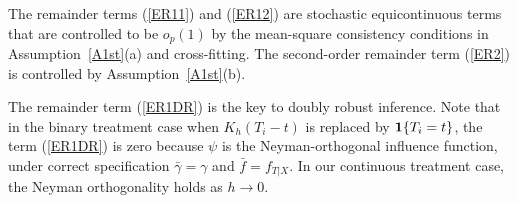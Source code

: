 \documentclass[lettersize, 12pt]{article}
\begin{document}
The remainder terms (\ref{ER11}) and (\ref{ER12}) are stochastic equicontinuous terms that are controlled to be $o_p(1)$ by
the mean-square consistency conditions in Assumption~\ref{A1st}(a) and cross-fitting.
The second-order remainder term (\ref{ER2}) is controlled by Assumption~\ref{A1st}(b).
 
The remainder term (\ref{ER1DR}) is the key to doubly robust inference.
Note that in the binary treatment case when $K_h(T_i - t)$ is replaced by ${\bf 1}\{T_i = t\}$, the term (\ref{ER1DR}) is zero because $\psi$ is the Neyman-orthogonal influence function, under correct specification $\bar \gamma = \gamma$ and $\bar f = f_{T|X}$. 
In our continuous treatment case, the Neyman orthogonality holds as $h \rightarrow 0$.


\end{document}
